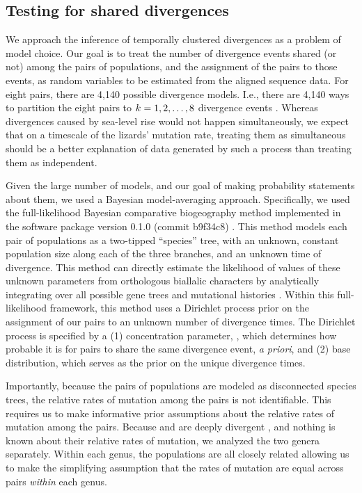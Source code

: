 \subsection{Testing for shared divergences}
We approach the inference of temporally clustered divergences as a problem of
model choice.
Our goal is to treat the number of divergence events shared (or not) among the
pairs of populations, and the assignment of the pairs to those events, as
random variables to be estimated from the aligned sequence data.
For eight pairs, there are 4,140 possible divergence models.
I.e., there are 4,140 ways to partition the eight pairs to $k_{} = 1, 2,
\ldots, 8$ divergence events \citep{Bell1934,Oaks2014dpp,Oaks2018ecoevolity}.
Whereas divergences caused by sea-level rise would not happen simultaneously,
we expect that on a timescale of the lizards' mutation rate, treating them as
simultaneous should be a better explanation of data generated by such a
process than treating them as independent.

Given the large number of models, and our goal of making probability statements
about them, we used a Bayesian model-averaging approach.
Specifically, we used the full-likelihood Bayesian comparative biogeography
method implemented in the software package \ecoevolity version 0.1.0 (commit
b9f34c8) \citep{Oaks2018ecoevolity}.
This method models each pair of populations as a two-tipped ``species'' tree,
with an unknown, constant population size along each of the three branches, and
an unknown time of divergence.
This method can directly estimate the likelihood of values of these unknown
parameters from orthologous biallalic characters by analytically integrating
over all possible gene trees and mutational histories \citep{Bryant2012,
    Oaks2018ecoevolity}.
Within this full-likelihood framework, this method uses a Dirichlet process
prior on the assignment of our pairs to an unknown number of divergence times.
The Dirichlet process is specified by a
(1) concentration parameter, \concentration, which determines how probable it
is for pairs to share the same divergence event, \emph{a priori}, and
(2) base distribution, which serves as the prior on the unique divergence
times.

Importantly, because the pairs of populations are modeled as disconnected
species trees, the relative rates of mutation among the pairs is not
identifiable.
This requires us to make informative prior assumptions about the relative rates
of mutation among the pairs.
Because  and  are deeply divergent
\citep[$>$ 80 mya;][]{Gamble2011},
and nothing is known about their relative rates of mutation, we analyzed the
two genera separately.
Within each genus, the populations are all closely related \citep{Welton2010,
    Welton2010zootaxa, Siler2010, Siler2012, Siler2014kikuchii} allowing us to
make the simplifying assumption that the rates of mutation are equal across
pairs \emph{within} each genus.

